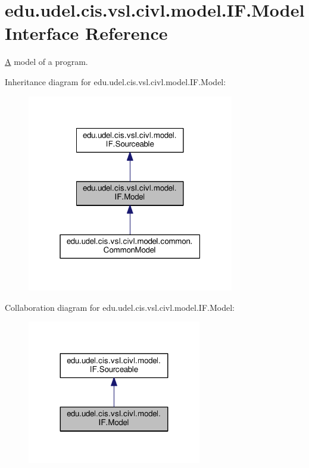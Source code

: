\hypertarget{interfaceedu_1_1udel_1_1cis_1_1vsl_1_1civl_1_1model_1_1IF_1_1Model}{}\section{edu.\+udel.\+cis.\+vsl.\+civl.\+model.\+I\+F.\+Model Interface Reference}
\label{interfaceedu_1_1udel_1_1cis_1_1vsl_1_1civl_1_1model_1_1IF_1_1Model}


\hyperlink{structA}{A} model of a program.  




Inheritance diagram for edu.\+udel.\+cis.\+vsl.\+civl.\+model.\+I\+F.\+Model\+:
\nopagebreak
\begin{figure}[H]
\begin{center}
\leavevmode
\includegraphics[width=256pt]{interfaceedu_1_1udel_1_1cis_1_1vsl_1_1civl_1_1model_1_1IF_1_1Model__inherit__graph}
\end{center}
\end{figure}


Collaboration diagram for edu.\+udel.\+cis.\+vsl.\+civl.\+model.\+I\+F.\+Model\+:
\nopagebreak
\begin{figure}[H]
\begin{center}
\leavevmode
\includegraphics[width=215pt]{interfaceedu_1_1udel_1_1cis_1_1vsl_1_1civl_1_1model_1_1IF_1_1Model__coll__graph}
\end{center}
\end{figure}
